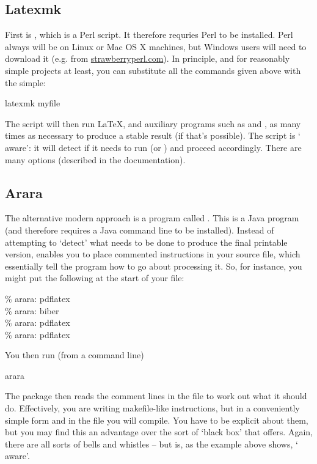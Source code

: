\subsection{Latexmk}

First is , which is a Perl script. It therefore
requries Perl to be installed. Perl always will be on Linux or Mac OS X
machines, but Windows users will need to download it (e.g. from
\url{strawberryperl.com}). In principle, and for reasonably simple
projects at least, you can substitute all the commands given above
with the simple:
\begin{pseudoverb}
latexmk myfile
\end{pseudoverb}
The script will then run \LaTeX, and auxiliary programs such as
 and , as many times as necessary to
produce a stable result (if that's possible). The 
script is ` aware': it will detect if it needs to run
 (or \bibtex) and proceed accordingly. There are many
options (described in the documentation).

\subsection{Arara}

The alternative modern approach is a program called
. This is a Java program (and therefore requires a Java
command line to be installed). Instead of attempting to `detect' what
needs to be done to produce the final printable version,
 enables you to place commented instructions in your
source file, which essentially tell the program how to go about
processing it. So, for instance, you might put the following at the
start of your file:
\begin{pseudoverb}
\% arara: pdflatex\\
\% arara: biber\\
\% arara: pdflatex\\
\% arara: pdflatex
\end{pseudoverb}
You then run (from a command line)
\begin{pseudoverb}
arara 
\end{pseudoverb}
The package then reads the comment lines in the file to work out what
it should do. Effectively, you are writing makefile-like instructions,
but in a conveniently simple form and in the file you will
compile. You have to be explicit about them, but you may find this an
advantage over the sort of `black box' that 
offers. Again, there are all sorts of bells and whistles -- but
 is, as the example above shows, `
aware'.

